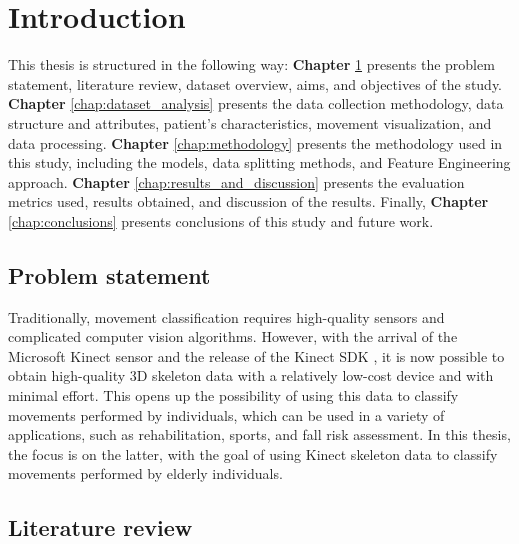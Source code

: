 \hypersetup{colorlinks=true, linkcolor=blue, citecolor=red}

\chapter{Introduction} \label{chap:introduction}

   This thesis is structured in the following way: \textbf{Chapter} \ref{chap:introduction} presents the problem statement, literature review, dataset overview, aims, and objectives of the study. \textbf{Chapter} \ref{chap:dataset_analysis} presents the data collection methodology, data structure and attributes, patient's characteristics, movement visualization, and data processing. \textbf{Chapter} \ref{chap:methodology} presents the methodology used in this study, including the models, data splitting methods, and Feature Engineering approach. \textbf{Chapter} \ref{chap:results_and_discussion} presents the evaluation metrics used, results obtained, and discussion of the results. Finally, \textbf{Chapter} \ref{chap:conclusions} presents conclusions of this study and future work.

   \section{Problem statement}

      Traditionally, movement classification requires high-quality sensors and complicated computer vision algorithms. However, with the arrival of the Microsoft Kinect sensor and the release of the Kinect SDK \cite{jana_kinect_2012}, it is now possible to obtain high-quality 3D skeleton data with a relatively low-cost device and with minimal effort. This opens up the possibility of using this data to classify movements performed by individuals, which can be used in a variety of applications, such as rehabilitation, sports, and fall risk assessment. In this thesis, the focus is on the latter, with the goal of using Kinect skeleton data to classify movements performed by elderly individuals.
  
   \section{Literature review}


